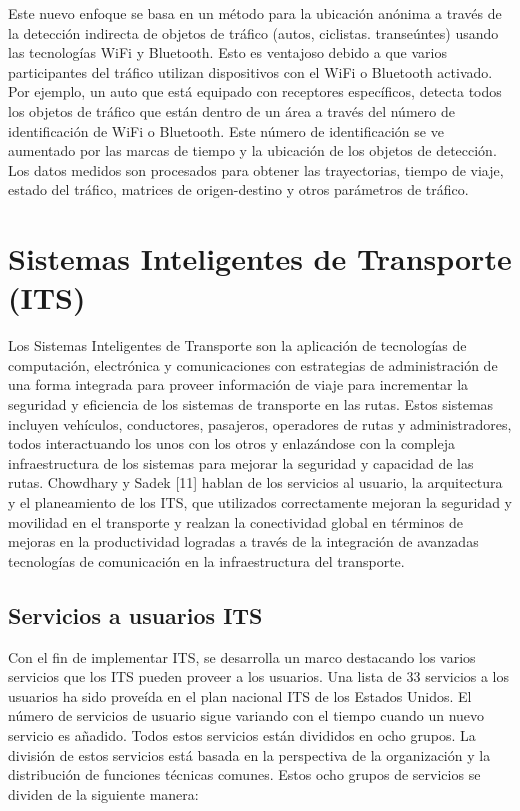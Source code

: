 \documentclass[final,fmstyle]{fpunathesis}
\begin{document}
Este nuevo enfoque se basa en un método para la ubicación anónima a través de la detección indirecta de objetos de tráfico (autos, ciclistas. transeúntes) usando las tecnologías WiFi y Bluetooth. Esto es ventajoso debido a que varios participantes del tráfico utilizan dispositivos con el WiFi o Bluetooth activado. Por ejemplo, un auto que está equipado con receptores específicos, detecta todos los objetos de tráfico que están dentro de un área a través del número de identificación de WiFi o Bluetooth. Este número de identificación se ve aumentado por las marcas de tiempo y la ubicación de los objetos de detección. Los datos medidos son procesados para obtener las trayectorias, tiempo de viaje, estado del tráfico, matrices de origen-destino y otros parámetros de tráfico.

\section{Sistemas Inteligentes de Transporte (ITS)}

Los Sistemas Inteligentes de Transporte son la aplicación de tecnologías de computación, electrónica y comunicaciones con estrategias de administración de una forma integrada para proveer información de viaje para incrementar la seguridad y eficiencia de los sistemas de transporte en las rutas. Estos sistemas incluyen vehículos, conductores, pasajeros, operadores de rutas y administradores, todos interactuando los unos con los otros y enlazándose con la compleja infraestructura de los sistemas para mejorar la seguridad y capacidad de las rutas. Chowdhary y Sadek [11] hablan de los servicios al usuario, la arquitectura y el planeamiento de los ITS, que utilizados correctamente mejoran la seguridad y movilidad en el transporte y realzan la conectividad global en términos de mejoras en la productividad logradas a través de la integración de avanzadas tecnologías de comunicación en la infraestructura del transporte.

\subsection{Servicios a usuarios ITS}

Con el fin de implementar ITS, se desarrolla un marco destacando los varios servicios que los ITS pueden proveer a los usuarios. Una lista de 33 servicios a los usuarios ha sido proveída en el plan nacional ITS de los Estados Unidos. El número de servicios de usuario sigue variando con el tiempo cuando un nuevo servicio es añadido. Todos estos servicios están divididos en ocho grupos. La división de estos servicios está basada en la perspectiva de la organización y la distribución de funciones técnicas comunes. Estos ocho grupos de servicios se dividen de la siguiente manera:
\end{document}
